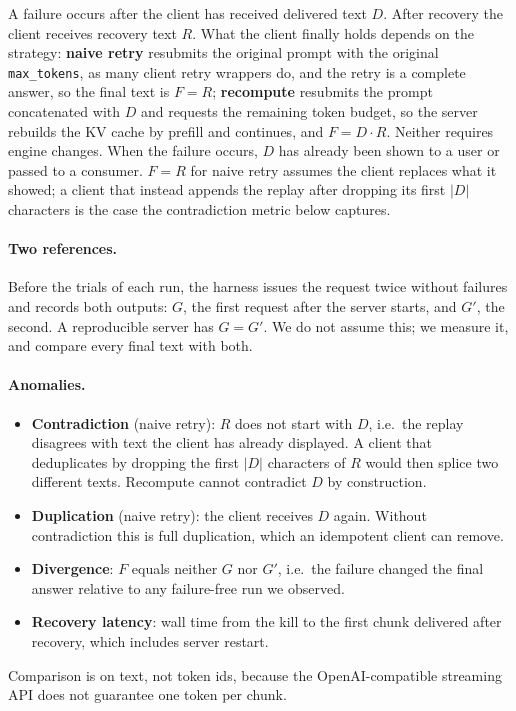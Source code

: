 \documentclass[10pt,twocolumn]{article}
\begin{document}
A failure occurs after the client has received delivered text $D$. After
recovery the client receives recovery text $R$. What the client finally holds
depends on the strategy:
\textbf{naive retry} resubmits the original prompt with the original
\texttt{max\_tokens}, as many client retry wrappers do, and the retry is a
complete answer, so the final text is $F=R$;
\textbf{recompute} resubmits the prompt concatenated with $D$ and requests the
remaining token budget, so the server rebuilds the KV cache by prefill and
continues, and $F=D\cdot R$. Neither requires engine changes. When the
failure occurs, $D$ has already been shown to a user or passed to a
consumer. $F=R$ for naive retry assumes the client replaces what it
showed; a client that instead appends the replay after dropping its first
$|D|$ characters is the case the contradiction metric below captures.

\paragraph{Two references.} Before the trials of each run, the harness
issues the request twice without failures and records both outputs: $G$, the
first request after the server starts, and $G'$, the second. A reproducible
server has $G=G'$. We do not assume this; we measure it, and compare every
final text with both.

\paragraph{Anomalies.}
\begin{itemize}
  \item \textbf{Contradiction} (naive retry): $R$ does not start with $D$,
    i.e.\ the replay disagrees with text the client has already displayed.
    A client that deduplicates by dropping the first $|D|$ characters of $R$
    would then splice two different texts. Recompute cannot contradict $D$
    by construction.
  \item \textbf{Duplication} (naive retry): the client receives $D$ again.
    Without contradiction this is full duplication, which an idempotent
    client can remove.
  \item \textbf{Divergence}: $F$ equals neither $G$ nor $G'$, i.e.\ the
    failure changed the final answer relative to any failure-free run we
    observed.
  \item \textbf{Recovery latency}: wall time from the kill to the first
    chunk delivered after recovery, which includes server restart.
\end{itemize}
Comparison is on text, not token ids, because the OpenAI-compatible streaming
API does not guarantee one token per chunk.
\end{document}
